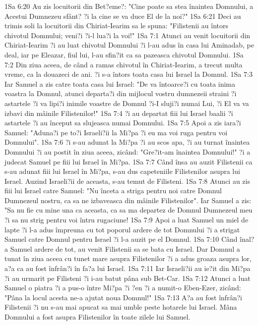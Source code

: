 1Sa 6:20  Au zis locuitorii din Bet?eme?: "Cine poate sa stea înaintea Domnului, a Acestui Dumnezeu sfânt? ?i la cine se va duce El de la noi?"
1Sa 6:21  Deci au trimis soli la locuitorii din Chiriat-Iearim sa le spuna: "Filistenii au întors chivotul Domnului; veni?i ?i-l lua?i la voi!"
1Sa 7:1  Atunci au venit locuitorii din Chiriat-Iearim ?i au luat chivotul Domnului ?i l-au adus în casa lui Aminadab, pe deal, iar pe Eleazar, fiul lui, l-au sfin?it ca sa pazeasca chivotul Domnului.
1Sa 7:2  Din ziua aceea, de când a ramas chivotul în Chiriat-Iearim, a trecut multa vreme, ca la douazeci de ani. ?i s-a întors toata casa lui Israel la Domnul.
1Sa 7:3  Iar Samuel a zis catre toata casa lui Israel: "De va întoarce?i cu toata inima voastra la Domnul, atunci departa?i din mijlocul vostru dumnezeii straini ?i astartele ?i va lipi?i inimile voastre de Domnul ?i-I sluji?i numai Lui, ?i El va va izbavi din mâinile Filistenilor!"
1Sa 7:4  ?i au departat fiii lui Israel baalii ?i astartele ?i au început sa slujeasca numai Domnului.
1Sa 7:5  Apoi a zis iara?i Samuel: "Aduna?i pe to?i Israeli?ii la Mi?pa ?i eu ma voi ruga pentru voi Domnului".
1Sa 7:6  ?i s-au adunat la Mi?pa ?i au scos apa, ?i au turnat înaintea Domnului ?i au postit în ziua aceea, zicând: "Gre?it-am înaintea Domnului!" ?i a judecat Samuel pe fiii lui Israel în Mi?pa.
1Sa 7:7  Când însa au auzit Filistenii ca s-au adunat fiii lui Israel în Mi?pa, s-au dus capeteniile Filistenilor asupra lui Israel. Auzind Israeli?ii de aceasta, s-au temut de Filisteni.
1Sa 7:8  Atunci au zis fiii lui Israel catre Samuel: "Nu înceta a striga pentru noi catre Domnul Dumnezeul nostru, ca sa ne izbaveasca din mâinile Filistenilor". Iar Samuel a zis: "Sa nu fie cu mine una ca aceasta, ca sa ma departez de Domnul Dumnezeul meu ?i sa nu strig pentru voi întru rugaciune!
1Sa 7:9  Apoi a luat Samuel un miel de lapte ?i l-a adus împreuna cu tot poporul ardere de tot Domnului ?i a strigat Samuel catre Domnul pentru Israel ?i l-a auzit pe el Domnul.
1Sa 7:10  Când înal?a Samuel ardere de tot, au venit Filistenii sa se bata cu Israel. Dar Domnul a tunat în ziua aceea cu tunet mare asupra Filistenilor ?i a adus groaza asupra lor, a?a ca au fost înfrân?i în fa?a lui Israel.
1Sa 7:11  Iar Israeli?ii au ie?it din Mi?pa ?i au urmarit pe Filisteni ?i i-au batut pâna sub Bet-Car.
1Sa 7:12  Atunci a luat Samuel o piatra ?i a pus-o între Mi?pa ?i ?en ?i a numit-o Eben-Ezer, zicând: "Pâna la locul acesta ne-a ajutat noua Domnul!"
1Sa 7:13  A?a au fost înfrân?i Filistenii ?i nu s-au mai apucat sa mai umble peste hotarele lui Israel. Mâna Domnului a fost asupra Filistenilor în toate zilele lui Samuel.
